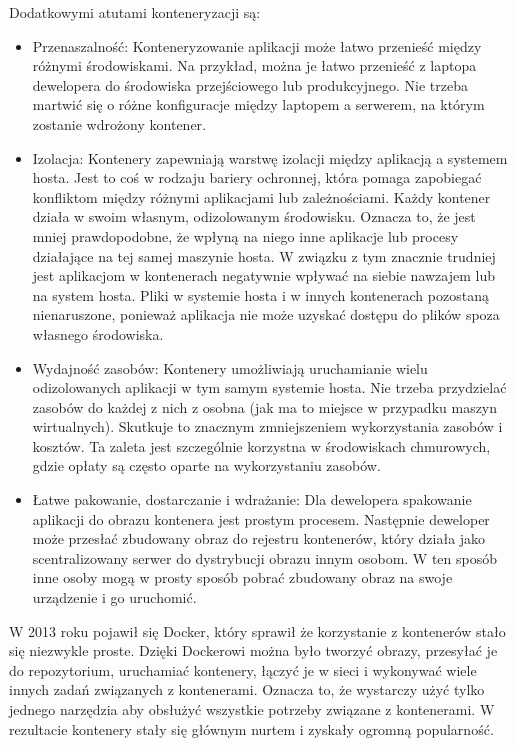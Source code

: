 Dodatkowymi atutami konteneryzacji są:

\begin{itemize}
    \item Przenaszalność: Konteneryzowanie aplikacji może łatwo przenieść między różnymi środowiskami. Na przykład, można je łatwo przenieść z laptopa dewelopera do środowiska przejściowego lub produkcyjnego. Nie trzeba martwić się o różne konfiguracje między laptopem a serwerem, na którym zostanie wdrożony kontener\cite{dockerContenerizationKeyAndUseCases}\cite{dockerOverview}.
    
    \item Izolacja: Kontenery zapewniają warstwę izolacji między aplikacją a systemem hosta. Jest to coś w rodzaju bariery ochronnej, która pomaga zapobiegać konfliktom między różnymi aplikacjami lub zależnościami. Każdy kontener działa w swoim własnym, odizolowanym środowisku. Oznacza to, że jest mniej prawdopodobne, że wpłyną na niego inne aplikacje lub procesy działające na tej samej maszynie hosta. W związku z tym znacznie trudniej jest aplikacjom w kontenerach negatywnie wpływać na siebie nawzajem lub na system hosta. Pliki w systemie hosta i w innych kontenerach pozostaną nienaruszone, ponieważ aplikacja nie może uzyskać dostępu do plików spoza własnego środowiska\cite{dockerContenerizationKeyAndUseCases}\cite{dockerOverview}.

    \item Wydajność zasobów: Kontenery umożliwiają uruchamianie wielu odizolowanych aplikacji w tym samym systemie hosta. Nie trzeba przydzielać zasobów do każdej z nich z osobna (jak ma to miejsce w przypadku maszyn wirtualnych). Skutkuje to znacznym zmniejszeniem wykorzystania zasobów i kosztów. Ta zaleta jest szczególnie korzystna w środowiskach chmurowych, gdzie opłaty są często oparte na wykorzystaniu zasobów\cite{dockerContenerizationKeyAndUseCases}\cite{dockerOverview}.

    \item Łatwe pakowanie, dostarczanie i wdrażanie: Dla dewelopera spakowanie aplikacji do obrazu kontenera jest prostym procesem. Następnie deweloper może przesłać zbudowany obraz do rejestru kontenerów, który działa jako scentralizowany serwer do dystrybucji obrazu innym osobom. W ten sposób inne osoby mogą w prosty sposób pobrać zbudowany obraz na swoje urządzenie i go uruchomić\cite{dockerContenerizationKeyAndUseCases}\cite{dockerOverview}.
\end{itemize}

W 2013 roku pojawił się Docker, który sprawił że korzystanie z kontenerów stało się niezwykle proste. Dzięki Dockerowi można było tworzyć obrazy, przesyłać je do repozytorium, uruchamiać kontenery, łączyć je w sieci i wykonywać wiele innych zadań związanych z kontenerami. Oznacza to, że wystarczy użyć tylko jednego narzędzia aby obsłużyć wszystkie potrzeby związane z kontenerami. W rezultacie kontenery stały się głównym nurtem i zyskały ogromną popularność\cite{dockerContenerizationKeyAndUseCases}\cite{dockerOverview}.

